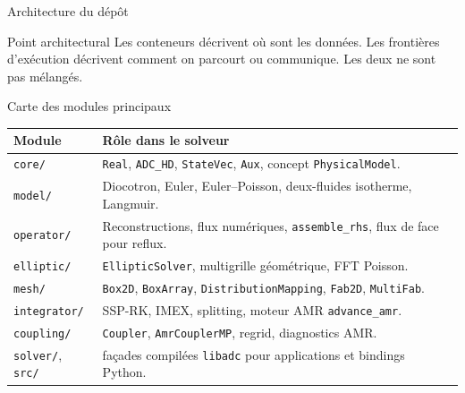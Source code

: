 \documentclass[10pt,aspectratio=169]{beamer}
\newcommand{\code}[1]{\texttt{\footnotesize #1}}
\begin{document}
\begin{frame}{Architecture du dépôt}
  \begin{center}
  \end{center}

  \vspace{0.15cm}
  \begin{block}{Point architectural}
    Les conteneurs décrivent où sont les données. Les frontières d'exécution décrivent
    comment on parcourt ou communique. Les deux ne sont pas mélangés.
  \end{block}
\end{frame}

\begin{frame}{Carte des modules principaux}
  \small
  \begin{tabular}{@{}p{}p{}@{}}
  \toprule
  \textbf{Module} & \textbf{Rôle dans le solveur} \\
  \midrule
  \code{core/} & \code{Real}, \code{ADC\_HD}, \code{StateVec}, \code{Aux}, concept \code{PhysicalModel}. \\
  \code{model/} & Diocotron, Euler, Euler--Poisson, deux-fluides isotherme, Langmuir. \\
  \code{operator/} & Reconstructions, flux numériques, \code{assemble\_rhs}, flux de face pour reflux. \\
  \code{elliptic/} & \code{EllipticSolver}, multigrille géométrique, FFT Poisson. \\
  \code{mesh/} & \code{Box2D}, \code{BoxArray}, \code{DistributionMapping}, \code{Fab2D}, \code{MultiFab}. \\
  \code{integrator/} & SSP-RK, IMEX, splitting, moteur AMR \code{advance\_amr}. \\
  \code{coupling/} & \code{Coupler}, \code{AmrCouplerMP}, regrid, diagnostics AMR. \\
  \code{solver/}, \code{src/} & façades compilées \code{libadc} pour applications et bindings Python. \\
  \bottomrule
  \end{tabular}
\end{frame}
\end{document}
